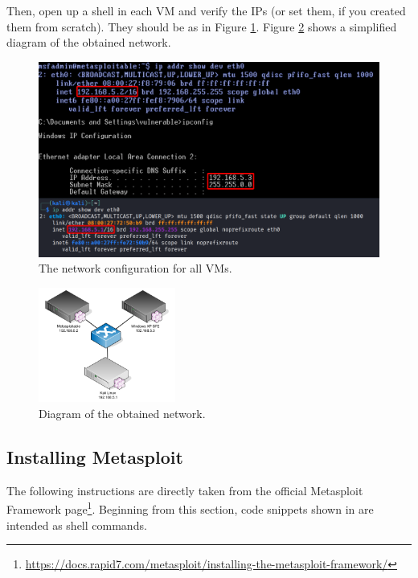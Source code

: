 Then, open up a shell in each VM and verify the IPs (or set them, if you created them from scratch). They should be as in Figure \ref{fig:getting-started:network-conf}. Figure \ref{fig:getting-started:network-diagram} shows a simplified diagram of the obtained network.

\begin{figure}[htbp]
	\centering
	\includegraphics[width=\textwidth]{../drawable/preliminaries_screenshots/prel-ips.png}
    \caption{The network configuration for all VMs.}
    \label{fig:getting-started:network-conf}
\end{figure}

\begin{figure}[htbp]
	\centering
	\includegraphics[width=0.4\textwidth]{../drawable/preliminaries_screenshots/prel-net.png}
    \caption{Diagram of the obtained network.}
    \label{fig:getting-started:network-diagram}
\end{figure}

\subsection{Installing Metasploit}
\label{subsec:getting-started:installing metasploit}

The following instructions are directly taken from the official Metasploit Framework page\footnote{\url{https://docs.rapid7.com/metasploit/installing-the-metasploit-framework/}}. Beginning from this section, code snippets shown in  are intended as shell commands.\cite{online:msf-installation}

